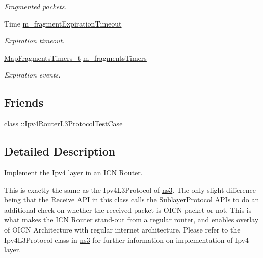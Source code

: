 \begin{DoxyCompactItemize}
\begin{DoxyCompactList}\small\item\em Fragmented packets. \end{DoxyCompactList}\item 
Time \hyperlink{classns3_1_1Ipv4RouterL3Protocol_ab643fecf4d7c8882c84ae9a028de4a43}{m\-\_\-fragment\-Expiration\-Timeout}
\begin{DoxyCompactList}\small\item\em Expiration timeout. \end{DoxyCompactList}\item 
\hyperlink{classns3_1_1Ipv4RouterL3Protocol_a1b7e366a2a7bbb1336aacaca4af8997b}{Map\-Fragments\-Timers\-\_\-t} \hyperlink{classns3_1_1Ipv4RouterL3Protocol_a684a2c09b96a0ae76b75d6e2dfc75caa}{m\-\_\-fragments\-Timers}
\begin{DoxyCompactList}\small\item\em Expiration events. \end{DoxyCompactList}\end{DoxyCompactItemize}
\subsection*{Friends}
\begin{DoxyCompactItemize}
\item 
class \hyperlink{classns3_1_1Ipv4RouterL3Protocol_a93f31871d44e5e2ec659210d100d874f}{\-::\-Ipv4\-Router\-L3\-Protocol\-Test\-Case}
\end{DoxyCompactItemize}


\subsection{Detailed Description}
Implement the Ipv4 layer in an I\-C\-N Router. 

This is exactly the same as the Ipv4\-L3\-Protocol of \hyperlink{namespacens3}{ns3}. The only slight difference being that the Receive A\-P\-I in this class calls the \hyperlink{classns3_1_1SublayerProtocol}{Sublayer\-Protocol} A\-P\-Is to do an additional check on whether the received packet is O\-I\-C\-N packet or not. This is what makes the I\-C\-N Router stand-\/out from a regular router, and enables overlay of O\-I\-C\-N Architecture with regular internet architecture. Please refer to the Ipv4\-L3\-Protocol class in \hyperlink{namespacens3}{ns3} for further information on implementation of Ipv4 layer. 

